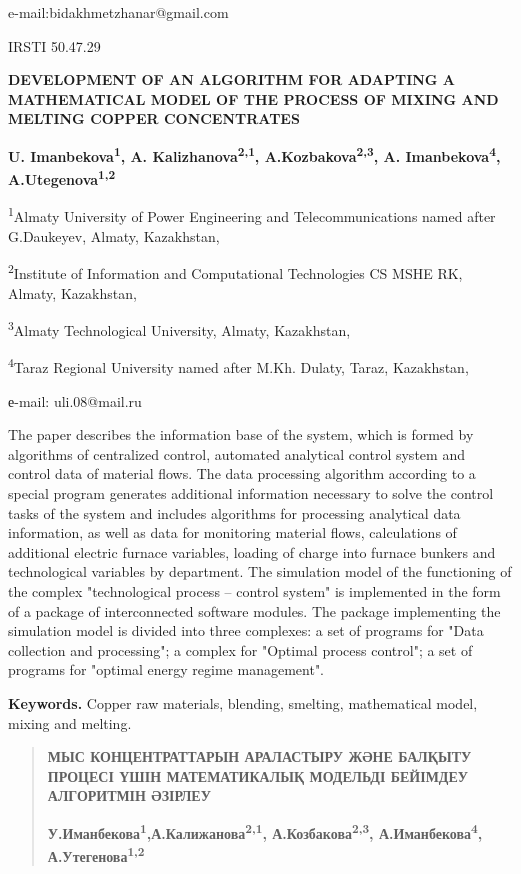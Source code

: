 e-mail:bidakhmetzhanar@gmail.com

IRSTI 50.47.29

\textbf{DEVELOPMENT OF AN ALGORITHM FOR ADAPTING A MATHEMATICAL MODEL OF
THE PROCESS OF MIXING AND MELTING COPPER CONCENTRATES}

\textbf{U. Imanbekova\textsuperscript{1}, A.
Kalizhanova\textsuperscript{2,1}, A.Kozbakova\textsuperscript{2,3}, A.
Imanbekova\textsuperscript{4}, A.Utegenova\textsuperscript{1,2}}

\textsuperscript{1}Almaty University of Power Engineering and
Telecommunications named after G.Daukeyev, Almaty, Kazakhstan,

\textsuperscript{2}Institute of Information and Computational
Technologies CS MSHE RK, Almaty, Kazakhstan,

\textsuperscript{3}Almaty Technological University, Almaty, Kazakhstan,

\textsuperscript{4}Taraz Regional University named after M.Kh. Dulaty,
Taraz, Kazakhstan,

е-mail: uli.08@mail.ru

The paper describes the information base of the system, which is formed
by algorithms of centralized control, automated analytical control
system and control data of material flows. The data processing algorithm
according to a special program generates additional information
necessary to solve the control tasks of the system and includes
algorithms for processing analytical data information, as well as data
for monitoring material flows, calculations of additional electric
furnace variables, loading of charge into furnace bunkers and
technological variables by department. The simulation model of the
functioning of the complex "technological process -- control system" is
implemented in the form of a package of interconnected software modules.
The package implementing the simulation model is divided into three
complexes: a set of programs for "Data collection and processing"; a
complex for "Optimal process control"; a set of programs for "optimal
energy regime management".

\textbf{Keywords.} Copper raw materials, blending, smelting,
mathematical model, mixing and melting.

\begin{quote}
\textbf{МЫС КОНЦЕНТРАТТАРЫН АРАЛАСТЫРУ ЖӘНЕ БАЛҚЫТУ ПРОЦЕСІ ҮШІН
МАТЕМАТИКАЛЫҚ МОДЕЛЬДІ БЕЙІМДЕУ АЛГОРИТМІН ӘЗІРЛЕУ}

\textbf{У.Иманбекова\textsuperscript{1},А.Калижанова\textsuperscript{2,1},
А.Козбакова\textsuperscript{2,3}, А.Иманбекова\textsuperscript{4},
А.Утегенова\textsuperscript{1,2}}
\end{quote}

